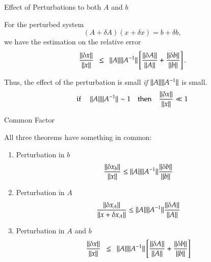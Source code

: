 \documentclass[10pt]{beamer}
\begin{document}
\begin{frame}{Effect of Perturbations to both $A$ and $b$}

{}

\begin{theorem}
For the perturbed system 
\begin{equation*}
    (A + \delta A) (x + \delta x) = b + \delta b, 
\end{equation*}
we have the estimation on the relative error 
\begin{equation*}
    \frac{{{\|\delta x\|}}}{{{\|x\|}}}
    \ \ \le \ \ {{\|A\|}}{{\|A^{-1}\|}} \left[ \frac{{{\|\delta A\|}}}{{{\|A\|}}} + \frac{{{\|\delta b\|}}}{{{\|b\|}}}\right].
\end{equation*}
\end{theorem}
Thus, the effect of the perturbation is small
\emph{if} ${{\|A\|}}{{\|A^{-1}\|}}$ is small.
\begin{equation*}
    \textrm{if } \quad {\ensuremath{{\|A\|}}}{\ensuremath{{\|A^{-1}\|}}} \sim 1
    \quad \text{then} \quad
    \frac{{{\|\delta x\|}}}{{{\|x\|}}} \ll 1
\end{equation*}
\end{frame}
\begin{frame}{Common Factor}

All three theorems have something in common:\\[4mm]
\begin{enumerate}
\item Perturbation in $b$
\begin{equation*}
\frac{{{\|\delta x_b\|}}}{{{\|x\|}}}
\le 
{\ensuremath{{\|A\|}}}{\ensuremath{{\|A^{-1}\|}}}
\frac{{{\|\delta b\|}}}{{{{\|b\|}}}}
\end{equation*}

\item Perturbation in $A$
\begin{equation*}
    \frac{{{\|\delta x_A\|}}}{{{\|x + \delta x_A\|}}} \le {\ensuremath{{\|A\|}}}{\ensuremath{{\|A^{-1}\|}}} \frac{{{\|\delta A\|}}}{{{\|A\|}}}
\end{equation*}

\item Perturbation in $A$ and $b$
\begin{equation*}
    \frac{{{\|\delta x\|}}}{{{\|x\|}}}
    \ \ \le \ \ {{\|A\|}}{{\|A^{-1}\|}} \left[ \frac{{{\|\delta A\|}}}{{{\|A\|}}} + \frac{{{\|\delta b\|}}}{{{\|b\|}}}\right]
\end{equation*}
\end{enumerate}
\vspace{4mm}
\begin{center}
\end{center}

\end{frame}
\end{document}
